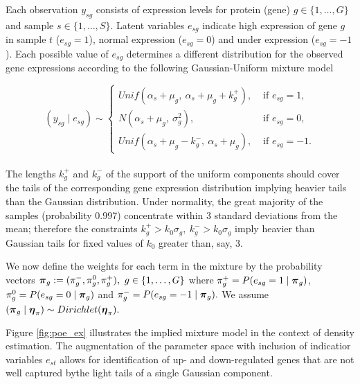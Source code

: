 Each observation $y_{sg}$ consists of expression levels for protein (gene) $g\in \{1, \dots, G\}$ and sample $s \in \{1, \dots, S\}$. Latent variables $e_{sg}$ indicate high expression of gene $g$ in sample $t$ ($e_{sg} = 1$), normal expression ($e_{sg} = 0$) and under expression ($e_{sg} = -1$). Each possible value of $e_{sg}$ determines a different distribution for the observed gene expressions according to the following Gaussian-Uniform mixture model

$$(y_{sg} \mid e_{sg}) \sim \begin{cases}
Unif(\alpha_s + \mu_g, \ \alpha_s + \mu_g + k^+_g), &\mbox{ if } e_{sg} = 1,\\
N(\alpha_s + \mu_g, \ \sigma^2_g), &\mbox{ if } e_{sg} = 0,\\
Unif(\alpha_s + \mu_g - k^-_g, \ \alpha_s + \mu_g), &\mbox{ if } e_{sg} = -1.
\end{cases}$$\\

The lengths  $k^+_g$ and $k^-_g$ of the support of the uniform components should cover the tails of the corresponding gene expression distribution implying heavier tails than the Gaussian distribution. Under normality, the great majority of the samples (probability 0.997) concentrate within 3 standard deviations from the mean; therefore the constraints $k^+_g > k_0 \sigma_g, \ k^-_g > k_0 \sigma_g$ imply heavier than Gaussian tails for fixed values of $k_0$ greater than, say, 3. 

We now define the weights for each term in the mixture by the probability vectors $\mbox{\boldmath $\pi$}_g:=(\pi^-_g, \pi^0_g, \pi^+_g), \ g \in \{1, \dots, G\}$ where $\pi^+_g = P(e_{sg} = 1 \mid \mbox{\boldmath $\pi$}_g) $, $\pi^0_g = P(e_{sg} = 0 \mid \mbox{\boldmath $\pi$}_g)$ and $\pi^-_g = P(e_{sg} = -1 \mid \mbox{\boldmath $\pi$}_g).$ We assume $(\mbox{\boldmath $\pi$}_g \mid \mbox{\boldmath $\eta$}_{\pi}) \sim Dirichlet(\mbox{\boldmath $\eta$}_{\pi}).$

Figure \ref{fig:poe_ex} illustrates the implied mixture model in the context of density estimation. The augmentation of the parameter space with inclusion of indicatior variables  $e_{st}$ allows for identification of up- and down-regulated genes that are not well captured bythe light tails of a single Gaussian component.

